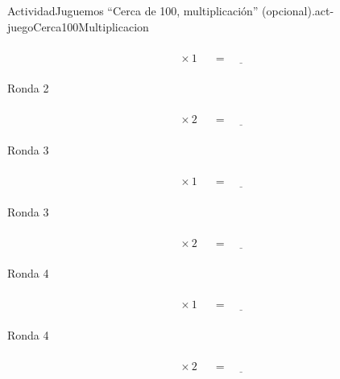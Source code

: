 \documentclass[14pt]{extarticle}
\begin{document}
\begin{activity}{Actividad}{Juguemos “Cerca de 100, multiplicación” (opcional).}{act-juegoCerca100Multiplicacion}
\begin{sidebyside}{2}{0}{0}{0.1}
\begin{sbspanel}{0.45}
\begin{equation*}
\boxed{\phantom{\frac{00}{00}}} \times 1 \ \boxed{\phantom{\frac{00}{00}}}= \underline{\hspace{1cm}}
\end{equation*}
%
\end{sbspanel}%
\begin{sbspanel}{0.45}%
Ronda 2%
\par
%
\begin{equation*}
\boxed{\phantom{\frac{00}{00}}} \times 2 \ \boxed{\phantom{\frac{00}{00}}}= \underline{\hspace{1cm}}
\end{equation*}
%
\end{sbspanel}%
\end{sidebyside}%
\begin{sidebyside}{2}{0}{0}{0.1}%
\begin{sbspanel}{0.45}%
Ronda 3%
\par
%
\begin{equation*}
\boxed{\phantom{\frac{00}{00}}} \times 1 \ \boxed{\phantom{\frac{00}{00}}}= \underline{\hspace{1cm}}
\end{equation*}
%
\end{sbspanel}%
\begin{sbspanel}{0.45}%
Ronda 3%
\par
%
\begin{equation*}
\boxed{\phantom{\frac{00}{00}}} \times 2 \ \boxed{\phantom{\frac{00}{00}}}= \underline{\hspace{1cm}}
\end{equation*}
%
\end{sbspanel}%
\end{sidebyside}%
\begin{sidebyside}{2}{0}{0}{0.1}%
\begin{sbspanel}{0.45}%
Ronda 4%
\par
%
\begin{equation*}
\boxed{\phantom{\frac{00}{00}}} \times 1 \ \boxed{\phantom{\frac{00}{00}}}= \underline{\hspace{1cm}}
\end{equation*}
%
\end{sbspanel}%
\begin{sbspanel}{0.45}%
Ronda 4%
\par
%
\begin{equation*}
\boxed{\phantom{\frac{00}{00}}} \times 2 \ \boxed{\phantom{\frac{00}{00}}}= \underline{\hspace{1cm}}
\end{equation*}

\end{sbspanel}
\end{sidebyside}
\end{activity}
\end{document}
